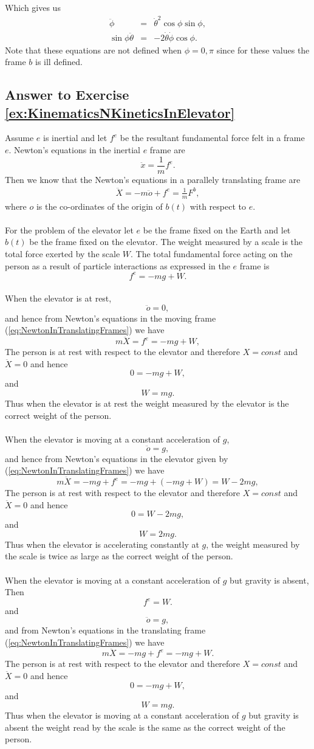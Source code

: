 \documentclass[graybox,envcountchap,sectrefs]{svmonoMuga}
\begin{document}
Which gives us
\begin{eqnarray*}
\ddot{\phi} &=& \dot{\theta}^2\cos{\phi}\sin{\phi},\\
\sin{\phi}\ddot{\theta} & = & -2\dot{\theta}\dot{\phi}\cos{\phi}.
\end{eqnarray*}
Note that these equations are not defined when $\phi=0,\pi$ since for these values the frame $b$ is ill defined.

\subsection*{Answer to Exercise \ref{ex:KinematicsNKineticsInElevator}}
Assume $e$ is inertial and let $f^e$ be the resultant fundamental force felt in a frame $e$.
Newton's equations in the inertial $e$ frame are
\[
\ddot{x}=\frac{1}{m}f^e.
\]
Then we know that the Newton's equations in a parallely translating frame are
\begin{align}
\ddot{X}=-m\ddot{o}+f^e=\frac{1}{m}F^b,\label{eq:NewtonInTranslatingFrames}
\end{align}
where $o$ is the co-ordinates of the origin of $b(t)$ with respect to $e$.
\\
\\
For the problem of the elevator let $e$ be the frame fixed on the Earth and let $b(t)$ be the frame fixed on the elevator. The weight measured by a scale is the total force exerted by 
the scale $W$. The total fundamental force acting on the person as a result of particle interactions as expressed in the $e$ frame is
\[
f^e=-mg+W.
\]
\\
When the elevator is at rest,
\[
\ddot{o}=0,
\]
and hence from Newton's equations in the moving frame (\ref{eq:NewtonInTranslatingFrames}) we have
\[
m\ddot{X}=f^e=-mg+W,
\]
The person is at rest with respect to the elevator and therefore $X=const$ and $\ddot{X}=0$ and hence
\[
0=-mg+W,
\]
and
\[
W=mg.
\]
Thus when the elevator is at rest the weight measured by the elevator is the correct weight of the person.\\
\\
When the elevator is moving at a constant acceleration of $g$,
\[
\ddot{o}=g,
\]
and hence from Newton's equations in the elevator given by (\ref{eq:NewtonInTranslatingFrames}) we have
\[
m\ddot{X}=-mg+f^e=-mg+(-mg+W)=W-2mg,
\]
The person is at rest with respect to the elevator and therefore $X=const$ and $\ddot{X}=0$ and hence
\[
0=W-2mg,
\]
and
\[
W=2mg.
\]
Thus when the elevator is accelerating constantly at $g$, the weight measured by the scale is twice as large as the correct weight of the person.\\
\\
When the elevator is moving at a constant acceleration of $g$ but gravity is absent,
Then
\[
f^e=W.
\]
and
\[
\ddot{o}=g,
\]
and from Newton's equations in the translating frame (\ref{eq:NewtonInTranslatingFrames}) we have
\[
m\ddot{X}=-mg+f^e=-mg+W.
\]
The person is at rest with respect to the elevator and therefore $X=const$ and $\ddot{X}=0$ and hence
\[
0=-mg+W,
\]
and
\[
W=mg.
\]
Thus when the elevator is moving at a constant acceleration of $g$ but gravity is absent the weight read by the scale is the same as the correct weight of the person.
\end{document}
